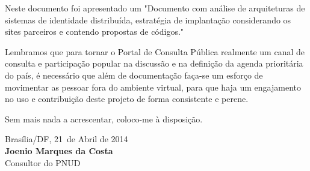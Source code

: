 \documentclass[11pt]{article}
\newcommand{\MyName}{Joenio Marques da Costa}
\newcommand{\ProductDescription}{"Documento com análise de arquiteturas de
        sistemas de identidade distribuída, estratégia de implantação
        considerando os sites parceiros e contendo propostas de códigos."
}
\newcommand{\MesEntrega}{Abril de 2014}
\newcommand{\DiaEntrega}{21}
\begin{document}
Neste documento foi apresentado um \ProductDescription

Lembramos que para tornar o Portal de Consulta Pública realmente um canal de
consulta e participação popular na discussão e na definição da agenda
prioritária do país, é necessário que além de documentação faça-se um esforço
de movimentar as pessoar fora do ambiente virtual, para que haja um
engajamento no uso e contribuição deste projeto de forma consistente e perene.

\vspace{1cm}

Sem mais nada a acrescentar, coloco-me à disposição.

\vspace{1cm}

\begin{minipage}{\textwidth}
  Brasília/DF, \DiaEntrega \ de \MesEntrega\\[1cm]
  \textbf{\MyName}\\
  \small Consultor do PNUD
\end{minipage}
\end{document}
